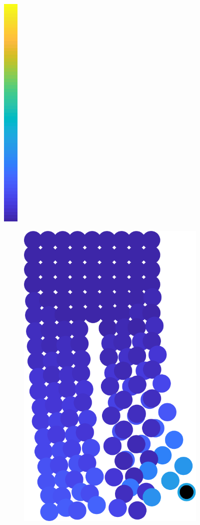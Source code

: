 \documentclass[11pt,a4paper, final, twoside]{article}
\theoremstyle{proposition}
\theoremstyle{definition}
\theoremstyle{remark}
\numberwithin{equation}{section}
\begin{document}
\begin{figure}[h]
\includegraphics[scale=.25]{parula.png}
\begin{subfigure}[t]{.5\textwidth}
  \centering
  \includegraphics{pantsLongStayColor.png}

\end{subfigure}
\end{figure}
\end{document}

